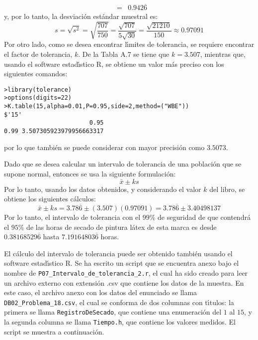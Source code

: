 \begin{solucion}
\begin{eqnarray*}
  & = & 0.942\overline{6}
 \end{eqnarray*}
 y, por lo tanto, la desviaci\'on est\'andar muestral es:
 \begin{equation*}
  s = \sqrt{s^2} = \sqrt{\frac{707}{750}} = \frac{\sqrt{707}}{5\sqrt{30}} = \frac{\sqrt{21210}}{150} \approx 0.97091
 \end{equation*}
 Por otro lado, como se desea encontrar l\'{\i}mites de tolerancia, se requiere encontrar el factor de tolerancia, $k$. De la Tabla A.7 se tiene que $k=3.507$, mientras que, usando el software estad\'{\i}stico R, se obtiene un valor m\'as preciso con los siguientes comandos:
 \begin{verbatim}
>library(tolerance)
>options(digits=22)
>K.table(15,alpha=0.01,P=0.95,side=2,method=("WBE"))
$'15'
                        0.95
0.99 3.507305923979956663317
 \end{verbatim}
 \vspace{-0.5cm}
 por lo que tambi\'en se puede considerar con mayor precisi\'on como $3.5073$.
 \par 
 Dado que se desea calcular un intervalo de tolerancia de una poblaci\'on que se supone normal, entonces se usa la siguiente formulaci\'on:
 \begin{equation*}
  \bar{x} \pm ks
 \end{equation*}
 Por lo tanto, usando los datos obtenidos, y considerando el valor $k$ del libro, se obtiene los siguientes c\'alculos:
 \begin{equation*}
  \bar{x} \pm ks= 3.78\overline{6} \pm (3.507)(0.97091) = 3.78\overline{6} \pm 3.40498137
 \end{equation*}
 Por lo tanto, el intervalo de tolerancia con el $99\%$ de seguridad de que contendr\'a el $95\%$ de las horas de secado de pintura l\'atex de esta marca es desde $0.38168529\overline{6}$ hasta $7.19164803\overline{6}$ horas.
 \par 
 El c\'alculo del intervalo de tolerancia puede ser obtenido tambi\'en usando el software estad\'{\i}stico R. Se ha escrito un script que  se encuentra anexo bajo el nombre de \texttt{P07\_Intervalo\_de\_tolerancia\_2.r}, el cual ha sido creado para leer un archivo externo con extensi\'on .csv que contiene los datos de la muestra. En este caso, el archivo anexo con los datos del enunciado se llama \texttt{DB02\_Problema\_18.csv}, el cual se conforma de dos columnas con t\'{\i}tulos: la primera se llama \texttt{RegistroDeSecado}, que contiene una enumeraci\'on del $1$ al $15$, y la segunda columna se llama \texttt{Tiempo.h}, que contiene los valores medidos. El script se muestra a continuaci\'on.

\end{solucion}
